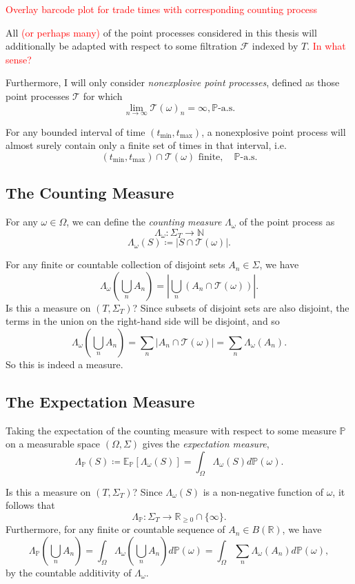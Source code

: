 \documentclass[honours,12pt]{unswthesis}
\numberwithin{equation}{section}
\begin{document}
\textcolor{red}{Overlay barcode plot for trade times with corresponding counting process}

All \textcolor{red}{(or perhaps many)} of the point processes considered in this thesis will additionally be adapted with respect to some filtration $\mathcal F$ indexed by $T$. \textcolor{red}{In what sense?}

Furthermore, I will only consider \textit{nonexplosive point processes}, defined as those point processes $\mathcal{T}$ for which
$$\lim_{n\to\infty}\mathcal{T}(\omega)_n=\infty, \mathbb{P}\text{-a.s.}$$

For any bounded interval of time $(t_{\min},t_{\max})$, a nonexplosive point process will almost surely contain only a finite set of times in that interval, i.e.
$$(t_{\min},t_{\max}) \cap \mathcal{T}(\omega) \text{ finite},\quad\mathbb{P}\text{-a.s.}$$

\subsection{The Counting Measure}
For any $\omega\in\Omega$, we can define the \textit{counting measure} $\Lambda_\omega$ of the point process as
$$\Lambda_\omega : \Sigma_T \to \mathbb{N}$$
$$\Lambda_\omega(S) \coloneq \left\vert S\cap \mathcal{T}(\omega)\right\vert.$$

For any finite or countable collection of disjoint sets $A_n\in\Sigma$, we have
$$\Lambda_\omega\left(\bigcup_n A_n\right) = \left\vert \bigcup_n \left(A_n\cap\mathcal{T}(\omega)\right)\right\vert.$$
Is this a measure on $(T,\Sigma_T)$? Since subsets of disjoint sets are also disjoint, the terms in the union on the right-hand side will be disjoint, and so
$$\Lambda_\omega\left(\bigcup_n A_n\right) = \sum_n\left\vert A_n\cap \mathcal{T}(\omega)\right\vert = \sum_n \Lambda_\omega(A_n).$$
So this is indeed a measure.

\subsection{The Expectation Measure}
Taking the expectation of the counting measure with respect to some measure $\mathbb{P}$ on a measurable space $(\Omega,\Sigma)$ gives the \textit{expectation measure},
$$\Lambda_\mathbb{P}(S)\coloneq \mathbb{E}_\mathbb{P}\left[\Lambda_\omega(S)\right] = \int_\Omega \Lambda_\omega(S)d\mathbb{P}(\omega).$$

Is this a measure on $(T,\Sigma_T)$? Since $\Lambda_\omega(S)$ is a non-negative function of $\omega$, it follows that $$\Lambda_{\mathbb{P}} : \Sigma_T \to \mathbb{R}_{\geq 0}\cap\{\infty\}.$$ Furthermore, for any finite or countable sequence of $A_n\in B(\mathbb{R})$, we have $$\Lambda_\mathbb{P}\left(\bigcup_n A_n\right) = \int_\Omega \Lambda_\omega\left(\bigcup_n A_n\right)d\mathbb{P}(\omega) = \int_\Omega \sum_n \Lambda_\omega(A_n) d\mathbb{P}(\omega),$$
by the countable additivity of $\Lambda_\omega$.
\end{document}
